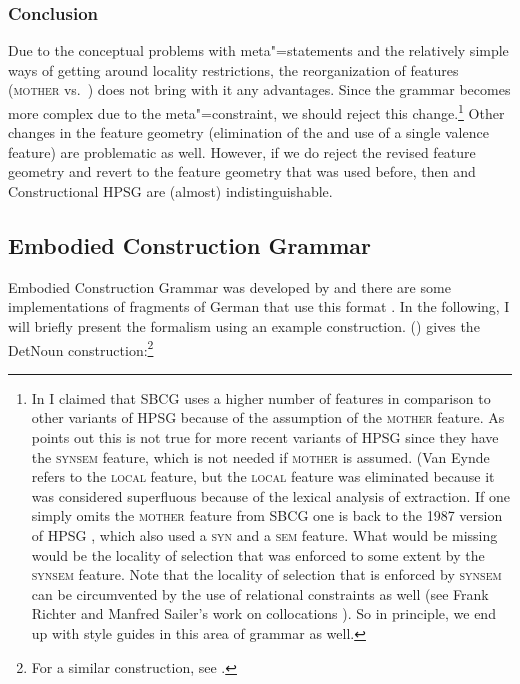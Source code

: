 \subsubsection{Conclusion}

\largerpage
Due to the conceptual problems with meta"=statements and the relatively simple ways of getting
around locality restrictions, the reorganization of features (\textsc{mother} vs.\ \synsem) does not bring with it any advantages. Since the grammar becomes more complex due to the meta"=constraint, we should
reject this change.\footnote{%
  In  I claimed that SBCG uses a higher number of features in comparison
  to other variants of HPSG because of the assumption of the \textsc{mother} feature. As \citet{VanEynde2015a} points out this is not true for more recent variants of HPSG since
 they have the \textsc{synsem} feature, which is not needed if \textsc{mother} is assumed. (Van Eynde refers to the \textsc{local}
 feature, but the \textsc{local} feature was eliminated because it was considered superfluous
 because of the lexical analysis of extraction.
 If one simply omits the \textsc{mother} feature from SBCG one is back to
 the 1987 version of HPSG \citep{ps}, which also used a \textsc{syn} and a \textsc{sem} feature. What would be
 missing would be the locality of selection \citep[]{Sag2012a} that was enforced to some extent by the \textsc{synsem}
 feature. Note that the locality of selection that is enforced by \textsc{synsem} can be
 circumvented by the use of relational constraints as well (see Frank Richter and Manfred Sailer's work on
 collocations \citep{RS99b-u,SS2003a}). So in principle, we end up with style guides in this
 area of grammar as well.%
} 
Other changes in the feature geometry (elimination of the \localf and use of a single valence
feature) are problematic as well. However, if we do reject the revised feature geometry and revert
to the feature geometry that was used before, then \sbcg and Constructional HPSG \citep{Sag97a} are (almost) indistinguishable.

\subsection{Embodied Construction Grammar}
\label{sec-ECG}

Embodied Construction Grammar was developed by \citet{BC2005a}  and there are some implementations of fragments of German that use this
format \citep{PMAZ2006a-u}. In the following, I will briefly present the formalism using an example construction.
() gives the DetNoun construction:\footnote{%
  For a similar construction, see .
}


